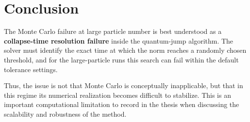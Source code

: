 \documentclass[12pt]{article}
\begin{document}
\section*{Conclusion}
The Monte Carlo failure at large particle number is best understood as a \textbf{collapse-time resolution failure} inside the quantum-jump algorithm. The solver must identify the exact time at which the norm reaches a randomly chosen threshold, and for the large-particle runs this search can fail within the default tolerance settings.

Thus, the issue is not that Monte Carlo is conceptually inapplicable, but that in this regime its numerical realization becomes difficult to stabilize. This is an important computational limitation to record in the thesis when discussing the scalability and robustness of the method.
\end{document}
